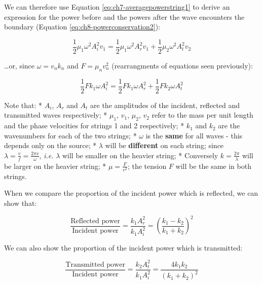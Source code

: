 \documentclass[
]{book}
\begin{document}
We can therefore use Equation \eqref{eq:ch7-averagepowerstring1} to derive an expression for the power before and the powers after the wave encounters the boundary (Equation \eqref{eq:ch8-powerconservation2}):

\begin{equation}
\frac{1}{2}\mu_1 \omega^2 A_i^2 v_1 = \frac{1}{2}\mu_1 \omega^2 A_r^2 v_1 + \frac{1}{2}\mu_2 \omega^2 A_t^2 v_2
\label{eq:ch8-powerconservation2}
\end{equation}

\ldots or, since \(\omega = v_n k_n\) and \(F = \mu_n v_n^2\) (rearrangments of equations seen previously):

\begin{equation}
\frac{1}{2} F k_1 \omega A_i^2  = \frac{1}{2}F k_1 \omega A_r^2 + \frac{1}{2}F k_2 \omega A_t^2
\label{eq:ch8-powerconservation3}
\end{equation}

Note that:
* \(A_i\), \(A_r\) and \(A_t\) are the amplitudes of the incident, reflected and transmitted waves respectively;
* \(\mu_1\), \(v_1\), \(\mu_2\), \(v_2\) refer to the mass per unit length and the phase velocities for strings 1 and 2 respectively;
* \(k_1\) and \(k_2\) are the wavenumbers for each of the two strings;
* \(\omega\) is the \textbf{same} for all waves - this depends only on the source;
* \(\lambda\) will be \textbf{different} on each string; since \(\lambda = \frac{v}{f} = \frac{2\pi v}{\omega}\), \emph{i.e.} \(\lambda\) will be smaller on the heavier string;
* Conversely \(k = \frac{2\pi}{\lambda}\) will be larger on the heavier string;
* \(\mu = \frac{F}{v^2}\); the tension \(F\) will be the same in both strings.

When we compare the proportion of the incident power which is reflected, we can show that:

\begin{equation}
\frac{\textrm{Reflected power}}{\textrm{Incident power}} = \frac{k_1 A_r^2}{k_1 A_i^2} = \left( \frac{k_1 - k_2}{k_1 + k_2} \right)^2
\label{eq:ch8-powerratio1}
\end{equation}

We can also show the proportion of the incident power which is transmitted:

\begin{equation}
\frac{\textrm{Transmitted power}}{\textrm{Incident power}} = \frac{k_2 A_t^2}{k_1 A_i^2} =  \frac{4k_1 k_2}{\left( k_1 + k_2\right)^2}
\label{eq:ch8-powerratio2}
\end{equation}
\end{document}
